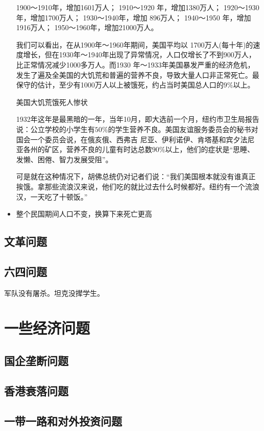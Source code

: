 \documentclass[UTF8,a4paper]{ctexart}
\begin{document}
\begin{itemize}
    1900～1910年，增加1601万人；
    1910～1920 年，增加1380万人；
    1920～1930年，增加1700万人；
    1930～1940年，增加 896万人；
    1940～1950 年，增加1916万人；
    1950～1960年，增加21000万人。
    
    我们可以看出，在从1900年～1960年期间，美国平均以 1700万人(每十年)的速度增长，但在1930年～1940年出现了异常情况，人口仅增长了不到900万人，比正常情况减少1000多万人。而1930 年～1933年美国暴发严重的经济危机，发生了遍及全美国的大饥荒和普遍的营养不良，导致大量人口非正常死亡。最保守的估计，至少有1000万人以上被饿死，约占当时美国总人口的$9\%$以上。
    
    美国大饥荒饿死人惨状
    
    1932年这年是最黑暗的一年，当年10月，即大选前一个月，纽约市卫生局报告说：公立学校的小学生有$50\%$的学生营养不良。美国友谊服务委员会的秘书对国会一个委员会说，在俄亥俄、西弗吉 尼亚、伊利诺伊、肯塔基和宾夕法尼亚各州的矿区，营养不良的儿童有时达总数$90\%$以上，他们的症状是“思睡、发懒、困倦、智力发展受阻”。
    
    可是就在这种情况下，胡佛总统仍对记者们说：“我们美国根本就没有谁真正挨饿。拿那些流浪汉来说，他们吃的就比过去什么时候都好。纽约有一个流浪汉，一天吃了十顿饭。”
    
    \item 整个民国期间人口不变，换算下来死亡更高
    
\end{itemize}

\subsection{文革问题}
\subsection{六四问题}
军队没有屠杀。坦克没撵学生。

\section{一些经济问题}
\subsection{国企垄断问题}
\subsection{香港衰落问题}
\subsection{一带一路和对外投资问题}
\end{document}
